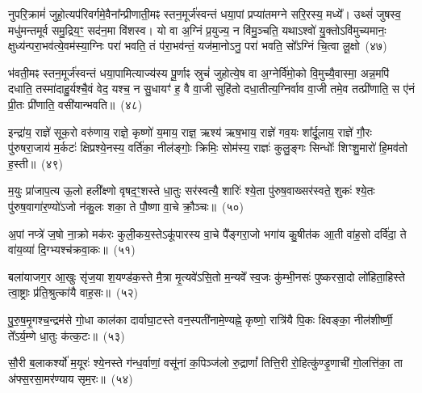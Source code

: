 नुपरि॒क्रामं॑ जुहो॒त्यप॑रिवर्गमे॒वैना᳚न्प्रीणाती॒मꣴ स्तन॒मूर्ज॑स्वन्तं धया॒पां प्रप्या॑तमग्ने सरि॒रस्य॒ मध्ये᳚। उथ्सं॑ जुषस्व॒ मधु॑मन्तमूर्व समु॒द्रिय॒ꣳ॒ सद॑न॒मा वि॑शस्व। यो वा अ॒ग्निं प्र॒युज्य॒ न वि॑मु॒ञ्चति॒ यथा\-ऽश्वो॑ यु॒क्तो\-ऽवि॑मुच्यमानः॒ क्षुध्य॑न्परा॒भव॑त्ये॒वम॑स्या॒ग्निः परा॑ भवति॒ तं प॑रा॒भव॑न्तं॒ यज॑मा॒नो\-ऽनु॒ परा॑ भवति॒ सो᳚\-ऽग्निं चि॒त्वा लू॒क्षो~(४७)\ip

भ॑वती॒मꣴ स्तन॒मूर्ज॑स्वन्तं धया॒पामित्याज्य॑स्य पू॒र्णाꣴ स्रुचं॑ जुहोत्ये॒ष वा अ॒ग्नेर्वि॑मो॒को वि॒मुच्यै॒वास्मा॒ अन्न॒मपि॑ दधाति॒ तस्मा॑दाहु॒र्यश्चै॒वं वेद॒ यश्च॒ न सु॒धायꣳ॑ ह॒ वै वा॒जी सुहि॑तो दधा॒तीत्य॒ग्निर्वाव वा॒जी तमे॒व तत्प्री॑णाति॒ स ए॑नं प्री॒तः प्री॑णाति॒ वसी॑यान्भवति॥~(४८)\ip

{\anuvakamend[{प्र॒तीची॒ दिक्तस्या᳚स्ते द्वि॒ष्मो यश्च॑ निलि॒म्पा नामे॒ह गृ॒हा इति॑ लू॒क्षो वसी॑यान्भवति}]}%

इन्द्रा॑य॒ राज्ञे॑ सूक॒रो वरु॑णाय॒ राज्ञे॒ कृष्णो॑ य॒माय॒ राज्ञ॒ ऋश्य॑ ऋष॒भाय॒ राज्ञे॑ गव॒यः शा᳚र्दू॒लाय॒ राज्ञे॑ गौ॒रः पु॑रुषरा॒जाय॑ म॒र्कटः॑ क्षिप्रश्ये॒नस्य॒ वर्ति॑का॒ नील॑ङ्गोः॒ क्रिमिः॒ सोम॑स्य॒ राज्ञः॑ कुलु॒ङ्गः सिन्धोः᳚ शिꣳशु॒मारो॑ हि॒मव॑तो ह॒स्ती॥~(४९)\ip

{\anuvakamend[{इन्द्रा॑या॒ष्टाविꣳ॑शतिः}]}%

म॒युः प्रा॑जाप॒त्य ऊ॒लो हली᳚क्ष्णो वृषद॒ꣳ॒शस्ते धा॒तुः सर॑स्वत्यै॒ शारिः॑ श्ये॒ता पु॑रुष॒वाख्सर॑स्वते॒ शुकः॑ श्ये॒तः पु॑रुष॒वागा॑र॒ण्यो॑\-ऽजो न॑कु॒लः शका॒ ते पौ॒ष्णा वा॒चे क्रौ॒ञ्चः॥~(५०)\ip

{\anuvakamend[{म॒युस्त्रयो॑विꣳशतिः}]}%

अ॒पां नप्त्रे॑ ज॒षो ना॒क्रो मक॑रः कुली॒कय॒स्ते\-ऽकू॑पारस्य वा॒चे पै᳚ङ्गरा॒जो भगा॑य कु॒षीत॑क आ॒ती वा॑ह॒सो दर्वि॑दा॒ ते वा॑य॒व्या॑ दि॒ग्भ्यश्च॑क्रवा॒कः॥~(५१)\ip

{\anuvakamend[{अ॒पामेका॒न्नविꣳ॑शतिः}]}%

बला॑याजग॒र आ॒खुः सृ॑ज॒या श॒यण्ड॑क॒स्ते मै॒त्रा मृ॒त्यवे॑\-ऽसि॒तो म॒न्यवे᳚ स्व॒जः कु॑म्भी॒नसः॑ पुष्करसा॒दो लो॑हिता॒हिस्ते त्वा॒ष्ट्राः प्र॑ति॒श्रुत्का॑यै वाह॒सः॥~(५२)\ip

{\anuvakamend[{}]}

पु॒रु॒ष॒मृ॒गश्च॒न्द्रम॑से गो॒धा काल॑का दार्वाघा॒टस्ते वन॒स्पती॑नामे॒ण्यह्ने॒ कृष्णो॒ रात्रि॑यै पि॒कः क्ष्विङ्का॒ नील॑शीर्ष्णी॒ ते᳚\-ऽर्य॒म्णे धा॒तुः क॑त्क॒टः॥~(५३)\ip

{\anuvakamend[{}]}

सौ॒री ब॒लाकर्श्यो॑ म॒यूरः॑ श्ये॒नस्ते ग॑न्ध॒र्वाणां॒ वसू॑नां क॒पिञ्ज॑लो रु॒द्राणां᳚ तित्ति॒री रो॒हित्कु॑ण्डृ॒णाची॑ गो॒लत्ति॑का॒ ता अ॑फ्स॒रसा॒मर॑ण्याय सृम॒रः॥~(५४)\ip

